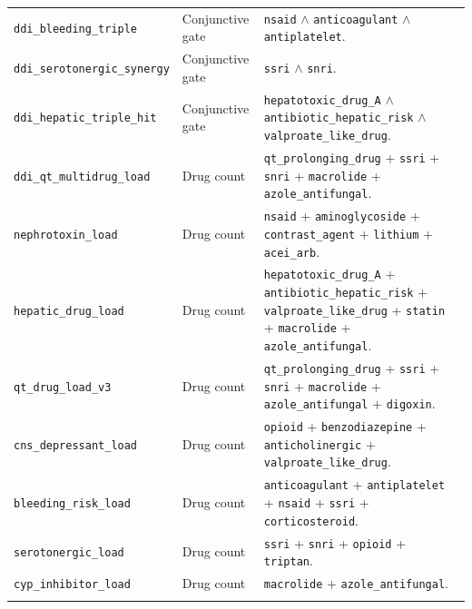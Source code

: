 \begin{longtable}{@{}p{}p{}p{}@{}}
\texttt{ddi\_bleeding\_triple} & Conjunctive gate & \texttt{nsaid} $\land$ \texttt{anticoagulant} $\land$ \texttt{antiplatelet}. \\
\addlinespace

\texttt{ddi\_serotonergic\_synergy} & Conjunctive gate & \texttt{ssri} $\land$ \texttt{snri}. \\
\addlinespace

\texttt{ddi\_hepatic\_triple\_hit} & Conjunctive gate & \texttt{hepatotoxic\_drug\_A} $\land$ \texttt{antibiotic\_hepatic\_risk} $\land$ \texttt{valproate\_like\_drug}. \\
\addlinespace

\texttt{ddi\_qt\_multidrug\_load} & Drug count & \texttt{qt\_prolonging\_drug} + \texttt{ssri} + \texttt{snri} + \texttt{macrolide} + \texttt{azole\_antifungal}. \\
\addlinespace

\texttt{nephrotoxin\_load} & Drug count & \texttt{nsaid} + \texttt{aminoglycoside} + \texttt{contrast\_agent} + \texttt{lithium} + \texttt{acei\_arb}. \\
\addlinespace

\texttt{hepatic\_drug\_load} & Drug count & \texttt{hepatotoxic\_drug\_A} + \texttt{antibiotic\_hepatic\_risk} + \texttt{valproate\_like\_drug} + \texttt{statin} + \texttt{macrolide} + \texttt{azole\_antifungal}. \\
\addlinespace

\texttt{qt\_drug\_load\_v3} & Drug count & \texttt{qt\_prolonging\_drug} + \texttt{ssri} + \texttt{snri} + \texttt{macrolide} + \texttt{azole\_antifungal} + \texttt{digoxin}. \\
\addlinespace

\texttt{cns\_depressant\_load} & Drug count & \texttt{opioid} + \texttt{benzodiazepine} + \texttt{anticholinergic} + \texttt{valproate\_like\_drug}. \\
\addlinespace

\texttt{bleeding\_risk\_load} & Drug count & \texttt{anticoagulant} + \texttt{antiplatelet} + \texttt{nsaid} + \texttt{ssri} + \texttt{corticosteroid}. \\
\addlinespace

\texttt{serotonergic\_load} & Drug count & \texttt{ssri} + \texttt{snri} + \texttt{opioid} + \texttt{triptan}. \\
\addlinespace

\texttt{cyp\_inhibitor\_load} & Drug count & \texttt{macrolide} + \texttt{azole\_antifungal}. \\
\addlinespace


\end{longtable}
